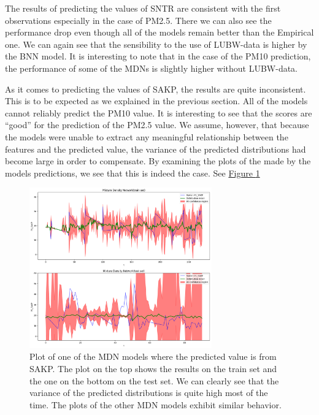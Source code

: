 \documentclass[12pt,a4paper,twoside]{scrartcl}
\numberwithin{equation}{section}
\newcommand{\reffig}[1]{\hyperref[#1]{Figure \ref*{#1}}}
\begin{document}
The results of predicting the values of SNTR are consistent with the first observations especially in the case of PM2.5. There we can also see the performance drop even though all of the models remain better than the Empirical one. We can again see that the sensibility to the use of LUBW-data is higher by the BNN model. It is interesting to note that in the case of the PM10 prediction, the performance of some of the MDNs is slightly higher without LUBW-data.

As it comes to predicting the values of SAKP, the results are quite inconsistent. This is to be expected as we explained in the previous section. All of the models cannot reliably predict the PM10 value. It is interesting to see that the scores are ``good'' for the prediction of the PM2.5 value. We assume, however, that because the models were unable to extract any meaningful relationship between the features and the predicted value, the variance of the predicted distributions had become large in order to compensate. By examining the plots of the made by the models predictions, we see that this is indeed the case. See \reffig{fig:mdn-bad}
\begin{center}
  \begin{figure}[H]
    \centering \includegraphics[height=0.55\textwidth,
    width=0.7\textwidth]{figures/mdn-bad}
    \caption[MDN plot on unreliable data ]{Plot of one of the MDN models where the predicted value is from SAKP. The plot on the top shows the results on the train set and the one on the bottom on the test set. We can clearly see that the variance of the predicted distributions is quite high most of the time. The plots of the other MDN models exhibit similar behavior.}\label{fig:mdn-bad}
  \end{figure}
\end{center}
\end{document}
